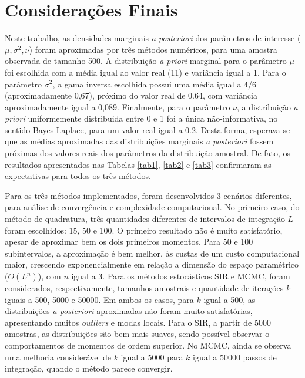 \section{Considerações Finais}\label{consfin}


Neste trabalho, as densidades marginais \textit{a posteriori} dos parâmetros de interesse ($\mu, \sigma^2, \nu$) foram aproximadas por três métodos numéricos, para uma amostra observada de tamanho 500. A distribuição \textit{a priori} marginal para o parâmetro $\mu$ foi escolhida com a média igual ao valor real (11) e variância igual a 1. Para o parâmetro $\sigma^2$, a gama inversa escolhida possui uma média igual a $4$/$6$ (aproximadamente 0,67), próximo do valor real de 0.64, com variância aproximadamente igual a 0,089. Finalmente, para o parâmetro $\nu$, a distribuição \textit{a priori} uniformemente distribuida entre 0 e 1 foi a única não-informativa, no sentido Bayes-Laplace, para um valor real igual a 0.2. Desta forma, esperava-se que as médias aproximadas das distribuições marginais \textit{a posteriori} fossem próximas dos valores reais dos parâmetros da distribuição amostral. De fato, os resultados apresentados nas Tabelas \ref{tab1}, \ref{tab2} e \ref{tab3} confirmaram as expectativas para todos os três métodos.

Para os três métodos implementados, foram desenvolvidos 3 cenários diferentes, para análise de convergência e complexidade computacional. No primeiro caso, do método de quadratura, três quantidades diferentes de intervalos de integração $L$ foram escolhidos: 15, 50 e 100. O primeiro resultado não é muito satisfatório, apesar de aproximar bem os dois primeiros momentos. Para 50 e 100 subintervalos, a aproximação é bem melhor, às custas de um custo computacional maior, crescendo exponencialmente em relação a dimensão do espaço paramétrico ($O(L^n)$), com $n$ igual a 3. Para os métodos estocásticos SIR e MCMC, foram considerados, respectivamente, tamanhos amostrais e quantidade de iterações $k$ iguais a 500, 5000 e 50000. Em ambos os casos, para $k$ igual a 500, as distribuições \textit{a posteriori} aproximadas não foram muito satisfatórias, apresentando muitos \textit{outliers} e modas locais. Para o SIR, a partir de 5000 amostras, as distribuições são bem mais suaves, sendo possível observar o comportamentos de momentos de ordem superior. No MCMC, ainda se observa uma melhoria considerável de $k$ igual a 5000 para $k$ igual a 50000 passos de integração, quando o método parece convergir.

